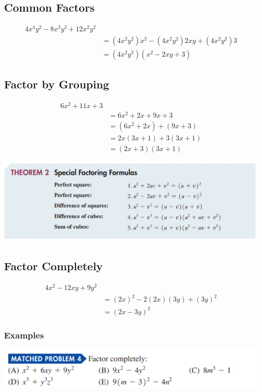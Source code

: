 \documentclass[14pt]{extarticle}
\begin{document}
\subsection{Common Factors}
\begin{align*}
	4x^4y^2 - 8x^3y^3 + 12x^2y^2 & \\
	&= (4x^2y^2)x^2 -(4x^2y^2)2xy + (4x^2y^2)3 \\
	&= (4x^2y^2)(x^2 - 2xy+3)
\end{align*}

\subsection{Factor by Grouping}
\begin{align*}
	6x^2 + 11x +3 & \\
	&= 6x^2 + 2x + 9x + 3 \\
	&= (6x^2 + 2x) + (9x + 3) \\
	&= 2x(3x+1) + 3(3x+1) \\
	&= (2x+3)(3x+1)
\end{align*}

\begin{center}
	\includegraphics[width=1\linewidth]{a-3-1}
\end{center}

\subsection{Factor Completely}
\begin{align*}
	4x^2 - 12xy +9y^2 & \\
	&= (2x)^2 - 2(2x)(3y) + (3y)^2 \\
	&= (2x - 3y)^2
\end{align*}

\subsubsection{Examples}
\begin{center}
	\includegraphics[width=0.9\linewidth]{a-3-2}
\end{center}
\end{document}
